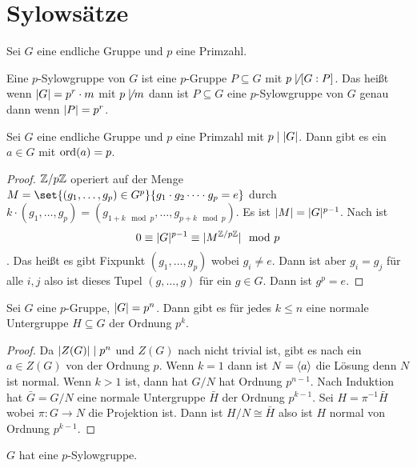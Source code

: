 \section{Sylowsätze}Sei \(G\) eine endliche Gruppe und \(p\) eine Primzahl.
\begin{Def}
    Eine \(p\)-Sylowgruppe von \(G\) ist eine \(p\)-Gruppe \(P\subseteq G\) mit \(p\not\mid[G:P]\). Das heißt wenn \(\lvert G\rvert=p^r\cdot m\) mit \(p\not\mid m\) dann ist \(P\subseteq G\) eine \(p\)-Sylowgruppe von \(G\) genau dann wenn \(\lvert P\rvert=p^r\).
\end{Def}
\begin{Lemma}\label{Lem:CauchyGrp}
    Sei \(G\) eine endliche Gruppe und \(p\) eine Primzahl mit \(p\mid \lvert G\rvert\). Dann gibt es ein \(a\in G\) mit \(\operatorname{ord}(a)=p\).
\end{Lemma}
\begin{proof}
    \(\mathbb{Z}/p\mathbb{Z}\) operiert auf der Menge \(M=\set{(g_1,\dots,g_p)\in G^p}{g_1\cdot g_2\dots \cdot g_p=e}\) durch \(k\cdot (g_1,\dots,g_p)=(g_{1+k\mod p},\dots,g_{p+k\mod p})\). Es ist \(\lvert M\rvert=\lvert G\rvert ^{p-1}\).
    Nach  ist \[0\equiv \lvert G\rvert^{p-1}\equiv \lvert M^{\mathbb{Z}/p\mathbb{Z}}\rvert\mod p\]. Das heißt es gibt Fixpunkt \((g_1,\dots,g_p)\) wobei \(g_i\neq e\).
    Dann ist aber \(g_i=g_j\) für alle \(i,j\) also ist dieses Tupel \((g,\dots ,g)\) für ein \(g\in G\). Dann ist \(g^p=e\).
\end{proof}
\begin{Kor}\label{Kor:NormIndex}
    Sei \(G\) eine \(p\)-Gruppe, \(\lvert G\rvert=p^n\). Dann gibt es für jedes \(k\leq n\) eine normale Untergruppe \(H\subseteq G\) der Ordnung \(p^k\).
\end{Kor}
\begin{proof}
    Da \(\lvert Z(G)\rvert\mid p^n\) und \(Z(G)\) nach  nicht trivial ist, gibt es nach  ein \(a\in Z(G)\) von der Ordnung \(p\). Wenn \(k=1\) dann ist \(N=\langle a\rangle\) die Lösung denn \(N\) ist normal. Wenn \(k>1\) ist, dann hat \(G/N\) hat Ordnung \(p^{n-1}\). Nach Induktion hat \(\bar G=G/N\) eine normale Untergruppe \(\bar H\) der Ordnung \(p^{k-1}\). Sei \(H=\pi^{-1}\bar H\) wobei \(\pi\colon G\to N\) die Projektion ist. Dann ist \(H/N\cong \bar H\) also ist \(H\) normal von Ordnung \(p^{k-1}\).
\end{proof}
\begin{Satz}[1. Sylowsatz]
    \(G\) hat eine \(p\)-Sylowgruppe.
\end{Satz}
